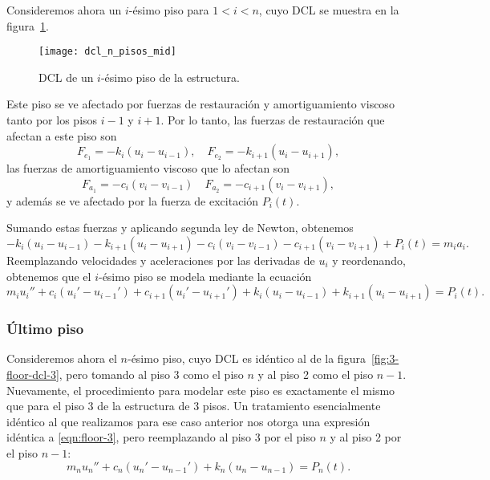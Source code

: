 Consideremos ahora un \(i\)-ésimo piso para \(1 < i < n\), cuyo DCL se muestra en la figura~\ref{fig:n-floor-dcl-mid}.

\begin{figure}[ht!]
    \centering
    \texttt{[image: dcl\_n\_pisos\_mid]}
    \caption{DCL de un \(i\)-ésimo piso de la estructura.}
    \label{fig:n-floor-dcl-mid}
\end{figure}

Este piso se ve afectado por fuerzas de restauración y amortiguamiento viscoso tanto por los pisos \(i - 1\) y \(i + 1\). Por lo tanto, las fuerzas de restauración que afectan a este piso son
\[
    F_{e_1} = -k_i(u_i - u_{i-1}), \quad F_{e_2} = -k_{i+1}(u_i - u_{i+1})
,\]
las fuerzas de amortiguamiento viscoso que lo afectan son
\[
    F_{a_1} = -c_i(v_i - v_{i-1}) \quad F_{a_2} = -c_{i+1}(v_i - v_{i+1})
,\]
y además se ve afectado por la fuerza de excitación \(P_i(t)\).

Sumando estas fuerzas y aplicando segunda ley de Newton, obtenemos
\[
    -k_i(u_i - u_{i-1}) - k_{i+1}(u_i - u_{i+1}) - c_i(v_i - v_{i-1}) - c_{i+1}(v_i - v_{i+1}) + P_i(t) = m_i a_i
.\]
Reemplazando velocidades y aceleraciones por las derivadas de \(u_i\) y reordenando, obtenemos que el \(i\)-ésimo piso se modela mediante la ecuación
\begin{equation}\label{eqn:final-floor-mid}
    m_i u_i'' + c_i(u_i' - u_{i-1}') + c_{i+1}(u_i' - u_{i+1}') + k_i(u_i - u_{i-1}) + k_{i+1}(u_i - u_{i+1}) = P_i(t)
.\end{equation}

\subsubsection*{Último piso}

Consideremos ahora el \(n\)-ésimo piso, cuyo DCL es idéntico al de la figura~\ref{fig:3-floor-dcl-3}, pero tomando al piso 3 como el piso \(n\) y al piso 2 como el piso \(n - 1\). Nuevamente, el procedimiento para modelar este piso es exactamente el mismo que para el piso 3 de la estructura de 3 pisos. Un tratamiento esencialmente idéntico al que realizamos para ese caso anterior nos otorga una expresión idéntica a \eqref{eqn:floor-3}, pero reemplazando al piso 3 por el piso \(n\) y al piso 2 por el piso \(n - 1\):
\begin{equation}\label{eqn:final-floor-last}
    m_n u_n'' + c_n(u_n' - u_{n-1}') + k_n(u_n - u_{n-1}) = P_n(t)
.\end{equation}


